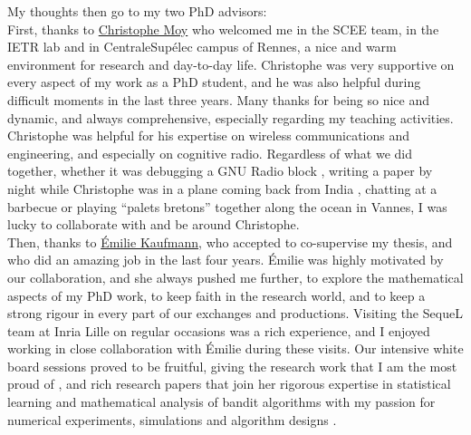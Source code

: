 \begin{acknowledgements}
My thoughts then go to my two PhD advisors:\\
%
\indent
First, thanks to \href{https://MoyChristophe.Wordpress.com/}{Christophe Moy} who welcomed me in the SCEE team, in the IETR lab and in CentraleSupélec campus of Rennes, a nice and warm environment for research and day-to-day life.
Christophe was very supportive on every aspect of my work as a PhD student, and he was also helpful during difficult moments in the last three years. Many thanks for being so nice and dynamic,
and always comprehensive, especially regarding my teaching activities.
Christophe was helpful for his expertise on wireless communications and engineering, and especially on cognitive radio.
Regardless of what we did together, whether it was debugging a GNU Radio block \cite{Besson2018ICT,Besson2019WCNC}, writing a paper by night while Christophe was in a plane coming back from India \cite{MoyBesson2019}, chatting at a barbecue or playing ``palets bretons'' together along the ocean in Vannes, I was lucky to collaborate with and be around Christophe.\\
%
\indent
Then, thanks to \href{http://chercheurs.lille.inria.fr/ekaufman/research.html}{Émilie Kaufmann}, who accepted to co-supervise my thesis, and who did an amazing job in the last four years.
Émilie was highly motivated by our collaboration, and she always pushed me further, to explore the mathematical aspects of my PhD work, to keep faith in the research world, and to keep a strong rigour in every part of our exchanges and productions.
Visiting the SequeL team at Inria Lille on regular occasions was a rich experience, and I enjoyed working in close collaboration with Émilie during these visits.
Our intensive white board sessions proved to be fruitful, giving the research work that I am the most proud of \cite{Besson2018ALT}, and rich research papers that join her rigorous expertise in statistical learning and mathematical analysis of bandit algorithms with my passion for numerical experiments, simulations and algorithm designs \cite{Besson2018ALT,Besson2018DoublingTricks,Besson2019GLRT}.


\end{acknowledgements}
